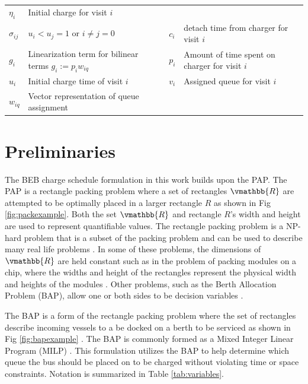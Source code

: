 \documentclass[letterpaper, 10pt, conference]{IEEEtran}
\begin{document}
\begin{table}[!t]
\begin{tabular}{l l l l}
			$\eta_i$      & Initial charge for visit $i$                  \\
			$\sigma_{ij}$ & $u_i < u_j = 1$ \textrm{ or } $i \neq j = 0$  &
			$c_i$         & detach time from charger for visit $i$                    \\
			$g_i$         & Linearization term for bilinear terms $g_i := p_i w_{iq}$  &
			$p_i$         & Amount of time spent on charger for visit $i$ \\
			$u_i$         & Initial charge time of visit $i$                          &
			$v_i$         & Assigned queue for visit $i$                  \\
			$w_{iq}$      & Vector representation of queue assignment                 \\
			\bottomrule
	\end{tabular}
\end{table}

\section{Preliminaries}
\label{sec:preliminaries}
The BEB charge schedule formulation in this work builds upon the PAP. The PAP is a rectangle packing problem where a set of rectangles \(\vmathbb{R}\) are attempted to be optimally placed in a larger rectangle \(R\) as shown in Fig \ref{fig:packexample}. Both the set \(\vmathbb{R}\) and rectangle \(R\)'s width and height are used to represent quantifiable values. The rectangle packing problem is a NP-hard problem that is a subset of the packing problem and can be used to describe many real life problems \cite{Bruin2013,Murata1995}. In some of these problems, the dimensions of \(\vmathbb{R}\) are held constant such as in the problem of packing modules on a chip, where the widths and height of the rectangles represent the physical width and heights of the modules \cite{Murata1995}. Other problems, such as the Berth Allocation Problem (BAP), allow one or both sides to be decision variables \cite{Buhrkal2010}.

The BAP is a form of the rectangle packing problem where the set of rectangles describe incoming vessels to a be docked on a berth to be serviced as shown in Fig \ref{fig:bapexample} \cite{Dai2008}. The BAP is commonly formed as a Mixed Integer Linear Program (MILP) \cite{Frojan2015,Buhrkal2010}. This formulation utilizes the BAP to help determine which queue the bus should be placed on to be charged without violating time or space constraints. Notation is summarized in Table \ref{tab:variables}.
\end{document}
